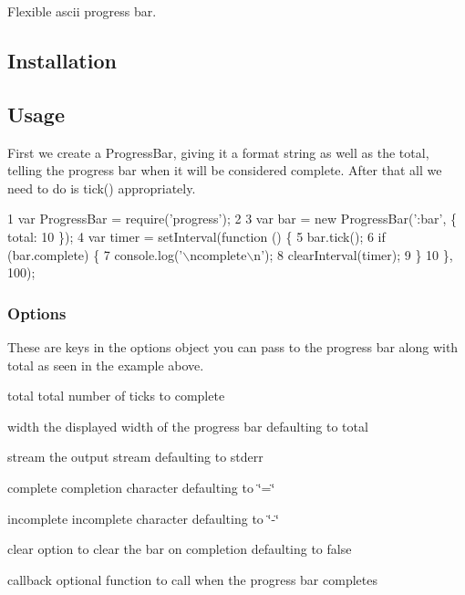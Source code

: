 Flexible ascii progress bar.

\subsection*{Installation}




\subsection*{Usage}

First we create a {\ttfamily Progress\+Bar}, giving it a format string as well as the {\ttfamily total}, telling the progress bar when it will be considered complete. After that all we need to do is {\ttfamily tick()} appropriately.


\begin{DoxyCode}
1 var ProgressBar = require('progress');
2 
3 var bar = new ProgressBar(':bar', \{ total: 10 \});
4 var timer = setInterval(function () \{
5   bar.tick();
6   if (bar.complete) \{
7     console.log('\(\backslash\)ncomplete\(\backslash\)n');
8     clearInterval(timer);
9   \}
10 \}, 100);
\end{DoxyCode}


\subsubsection*{Options}

These are keys in the options object you can pass to the progress bar along with {\ttfamily total} as seen in the example above.


\begin{DoxyItemize}
\item {\ttfamily total} total number of ticks to complete
\item {\ttfamily width} the displayed width of the progress bar defaulting to total
\item {\ttfamily stream} the output stream defaulting to stderr
\item {\ttfamily complete} completion character defaulting to \char`\"{}=\char`\"{}
\item {\ttfamily incomplete} incomplete character defaulting to \char`\"{}-\/\char`\"{}
\item {\ttfamily clear} option to clear the bar on completion defaulting to false
\item {\ttfamily callback} optional function to call when the progress bar completes
\end{DoxyItemize}

